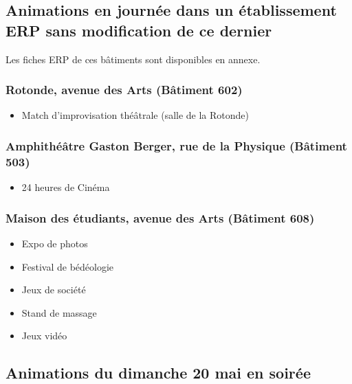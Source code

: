 \documentclass[hidelinks, paper=a4, fontsize=13pt]{report}
\begin{document}
\subsection{Animations en journée dans un établissement ERP sans modification de ce dernier}

Les fiches ERP de ces bâtiments sont disponibles en annexe.

\subsubsection{Rotonde, avenue des Arts (Bâtiment 602)}
\begin{itemize}
\item Match d’improvisation théâtrale (salle de la Rotonde)
\end{itemize}

\subsubsection{Amphithéâtre Gaston Berger, rue de la Physique (Bâtiment 503)}
\begin{itemize}
\item 24 heures de Cinéma
\end{itemize}

\subsubsection{Maison des étudiants, avenue des Arts (Bâtiment 608)}
\begin{itemize}
\item Expo de photos
\item Festival de bédéologie
\item Jeux de société
\item Stand de massage
\item Jeux vidéo
\end{itemize}


\subsection{Animations du dimanche 20 mai en soirée}
\end{document}
